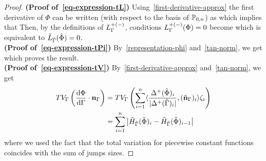 \begin{proof} 
\textbf{(Proof of~\eqref{eq-expression-tL})} Using~\eqref{first-derivative-approx}  the first derivative of $\Phi$ can be written (with respect to the basis of $\mathbb{P}_{0,n}$) as 
which implies that
Then, by the definitions of $L_{\Gamma}^{+(-)}$,  conditions $L_{\Gamma}^{+(-)}(\Phi)=0$ become
which is equivalent to $\tilde{L}_{\tilde{\Gamma}}(\tilde{\Phi})=0$.\\
\textbf{(Proof of~\eqref{eq-expression-tPi})} By~\eqref{representation-phi} and~\eqref{tan-norm}, we get 
which proves the result. \\
\textbf{(Proof of~\eqref{eq-expression-tV})} By~\eqref{first-derivative-approx} and~\eqref{tan-norm}, we get
\begin{align*}
  TV_\Gamma\left( \frac{\mathrm{d} \Phi}{\mathrm{d} \Gamma}\cdot {\bf n}_\Gamma\right)
  &=  
  TV_\Gamma\left( \sum_{i=1}^n \langle\frac{\Delta^+(\tilde{\Phi})_i}{|\Delta^+(\tilde{\Gamma})_i|},(\tilde{\bf n}_\Gamma)_i \rangle\zeta_i \right)\\
  &= \sum_{i=1}^n
		\left| 
			\tilde H_{\tilde{\Gamma}}(\tilde{\Phi})_i
			-
			\tilde H_{\tilde{\Gamma}}(\tilde{\Phi})_{i-1}
		\right|
\end{align*}
where we used the fact that the  total variation for piecewise constant functions coincides with the sum of jumps sizes.
\end{proof}



